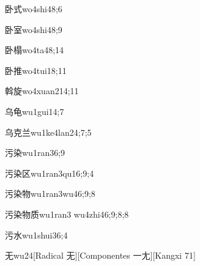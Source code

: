 \begin{verbete}{卧式}{wo4shi4}{8;6}
\end{verbete}

\begin{verbete}{卧室}{wo4shi4}{8;9}
\end{verbete}

\begin{verbete}{卧榻}{wo4ta4}{8;14}
\end{verbete}

\begin{verbete}{卧推}{wo4tui1}{8;11}
\end{verbete}

\begin{verbete}{斡旋}{wo4xuan2}{14;11}
\end{verbete}

\begin{verbete}{乌龟}{wu1gui1}{4;7}
\end{verbete}

\begin{verbete}{乌克兰}{wu1ke4lan2}{4;7;5}
\end{verbete}

\begin{verbete}{污染}{wu1ran3}{6;9}
\end{verbete}

\begin{verbete}{污染区}{wu1ran3qu1}{6;9;4}
\end{verbete}

\begin{verbete}{污染物}{wu1ran3wu4}{6;9;8}
\end{verbete}

\begin{verbete}{污染物质}{wu1ran3 wu4zhi4}{6;9;8;8}
\end{verbete}

\begin{verbete}{污水}{wu1shui3}{6;4}
\end{verbete}

\begin{verbete}{无}{wu2}{4}[Radical 无][Componentes 一尢][Kangxi 71]
\end{verbete}

